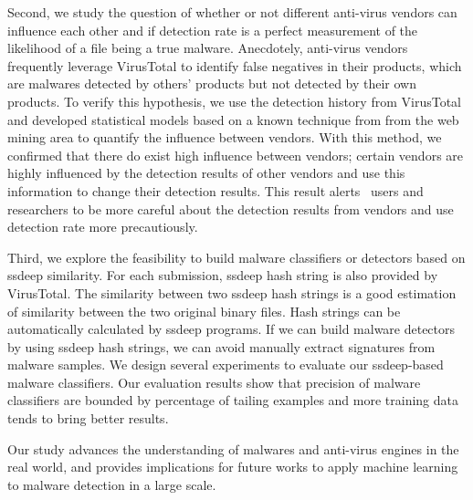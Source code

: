 Second, we study the question of whether or not different anti-virus vendors can influence each other
and if detection rate is a perfect measurement of the likelihood of a file being a true malware.
Anecdotely, anti-virus vendors frequently leverage VirusTotal to identify false negatives in their products, 
which are malwares detected by others’ products but not detected by their own products. 
To verify this hypothesis, we use the detection history from VirusTotal 
and developed statistical models based on a known technique from from the web mining area to quantify the influence between vendors. 
With this method, we confirmed that there do exist high influence between vendors;
certain vendors are highly influenced by the detection results of other vendors and use this information to change their detection results.
This result alerts \vt\ users and researchers to be more careful about the detection results from vendors 
and use detection rate more precautiously.

Third, we explore the feasibility to build malware classifiers or detectors based on ssdeep similarity. 
For each submission, ssdeep hash string is also provided by VirusTotal. 
The similarity between two ssdeep hash strings 
is a good estimation of similarity between the two original binary files.
Hash strings can be automatically calculated by ssdeep programs. 
If we can build malware detectors by using ssdeep hash strings, 
we can avoid manually extract signatures from malware samples.   
We design several experiments to evaluate our ssdeep-based malware classifiers. 
Our evaluation results show that precision of malware classifiers are 
bounded by percentage of tailing examples and more training data tends to bring better results.

Our study advances the understanding of malwares and anti-virus engines in the real world, 
and provides implications for future works to 
apply machine learning to malware detection in a large scale. 

